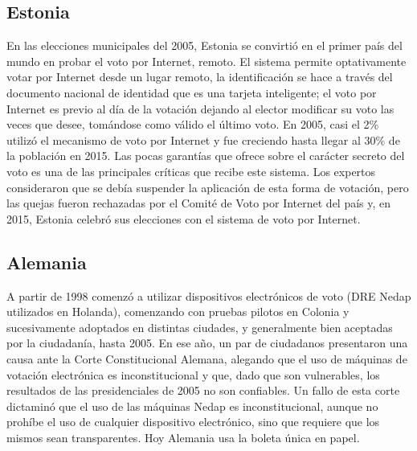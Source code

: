\subsection{Estonia}
En las elecciones municipales del 2005, Estonia se convirtió en el primer país del mundo en probar el voto por Internet, remoto. El sistema permite optativamente votar por Internet desde un lugar remoto, la identificación se hace a través del documento nacional de identidad que es una tarjeta inteligente; el voto por Internet es previo al día de la votación dejando al elector modificar su voto las veces que desee, tomándose como válido el último voto. En 2005, casi el 2\% utilizó el mecanismo de voto por Internet y fue creciendo hasta llegar al 30\% de la población en 2015. Las pocas garantías que ofrece sobre el carácter secreto del voto es una de las principales críticas que recibe este sistema. Los expertos consideraron que se debía suspender la aplicación de esta forma de votación, pero las quejas fueron rechazadas por el Comité de Voto por Internet del país y, en 2015, Estonia celebró sus elecciones con el sistema de voto por Internet.\cite{vassil2016diffusion}


\subsection{Alemania}
A partir de 1998 comenzó a utilizar dispositivos electrónicos de voto (DRE Nedap utilizados en Holanda), comenzando con pruebas pilotos en Colonia y sucesivamente adoptados en distintas ciudades, y generalmente bien aceptadas por la ciudadanía, hasta 2005. En ese año, un par de ciudadanos presentaron una causa ante la Corte Constitucional Alemana, alegando que el uso de máquinas de votación electrónica es inconstitucional y que, dado que son vulnerables, los resultados de las presidenciales de 2005 no son confiables. Un fallo de esta corte dictaminó que el uso de las máquinas Nedap es inconstitucional, aunque no prohíbe el uso de cualquier dispositivo electrónico, sino que requiere que los mismos sean transparentes. Hoy Alemania usa la boleta única en papel.\cite{volkamer2010electronic}

